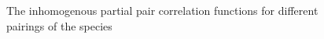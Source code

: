 \documentclass[12pt,a4paper,oneside,article]{memoir}
\begin{document}
\begin{figure}[htbp]
  \begin{adjustwidth}{-2in}{-2in}
	  \centering
  \end{adjustwidth}
  \caption{The inhomogenous partial pair correlation functions for different pairings of the species}
  \label{fig:ppcf}
\end{figure}
\end{document}
